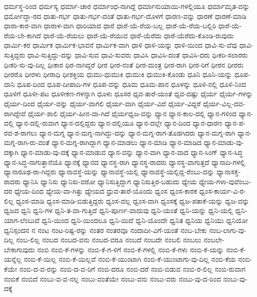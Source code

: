 {ಧರ್ಮಸ್ಥ-ರಿಂದ
ಧರ್ಮಸ್ಯ
ಧರ್ಮಾ-ಚಾರ
ಧರ್ಮಾಂಧ-ನಾಗಿದ್ದೆ
ಧರ್ಮಾನುಯಾಯಿ-ಗಳಲ್ಲಿಯೂ
ಧರ್ಮಾಮೃತ-ವನ್ನು
ಧರ್ಮೋದ್ಧಾ-ರದ
ಧಾತು-ಗರ್ಭ
ಧಾತು-ಗರ್ಭ-ದಂತೆ
ಧಾತು-ಗರ್ಭ-ದೊಳಗೆ
ಧಾರಣ-ವನ್ನು
ಧಾರಣೆ
ಧಾರಣೆ-ಮಾಡಿ
ಧಾರಾ-ಕಾರ-ವಾಗಿ
ಧಾರಾಳ-ವಾಗಿ
ಧಾರಿಯಾದ
ಧಾರೆ
ಧಾರೆ-ಯೆ-ರೆಯ-ಬಲ್ಲ
ಧಾರೆ-ಯೆ-ರೆಯ-ಬಲ್ಲಿರಿ
ಧಾರೆ-ಯೆ-ರೆಯ-ಬೇ-ಕಾಗಿದೆ
ಧಾರೆ-ಯೆ-ರೆಯಲು
ಧಾರೆ-ಯೆ-ರೆಯುವ
ಧಾರೆ-ಯೆರೆದು
ಧಾರೆ-ಯೆರೆದು-ಕೊಂಡಿ-ರುವುದು
ಧಾರ್ಮಿ-ಕರ
ಧಾರ್ಮಿಕ
ಧಾರ್ಮಿಕ-ಭಾವನೆ
ಧಾರ್ಮಿಕ-ವಾಗಿ
ಧಾಳಿ
ಧಾಳಿ-ಯನ್ನು
ಧಾಳಿ-ಯಿಂದ
ಧಾವಿ-ಸು-ವೆವು
ಧಾವಿ-ಸುತ್ತಿದ್ದರು
ಧಾವಿ-ಸುತ್ತಿದ್ದು-ದನ್ನು
ಧಾವಿ-ಸುವ
ಧಾವಿ-ಸುವರು
ಧಾವಿಸಿ
ಧಾವಿಸಿ-ದಂತೆ
ಧಾವಿಸಿ-ದರು
ಧಿಃಕರಿ-ಸಲಾರರು
ಧಿಃಕರಿ-ಸು-ವು-ದಿಲ್ಲ
ಧಿಃಕಾರ
ಧಿರ-ನಾಗಿದ್ದರೆ
ಧೀರ
ಧೀರ-ನಂತೆ
ಧೀರ-ಮಂತ್ರ
ಧೀರ-ರಾಗಿ
ಧೀರ-ರಿಗೆ
ಧೀರನ
ಧೀರರು
ಧೀರರೊ
ಧೀರಳು
ಧೀರಾಧಿ
ಧೀಶಕ್ತಿಯ
ಧುಮು-ಧುಮುಕಿ
ಧುಮುಕಿ
ಧುಮುಕಿ-ಕೊಂಡು
ಧೂನಿ
ಧೂನಿ-ಯನ್ನು
ಧೂಪ-ದಾನಿ
ಧೂಪ-ದಿಂದ
ಧೂಪ-ದೀಪಾದಿ-ಗಳ
ಧೂಪ-ವನ್ನು
ಧೂಮ
ಧೂಮ-ಪಾನ
ಧೂಳನ್ನು
ಧೂಳಿ-ನಲ್ಲಿ
ಧೂಳಿ-ನಿಂದ
ಧೂಳಿಗೆ
ಧೂಳೀ-ಪಟ
ಧೂಳೀಕಣ-ಗಳನ್ನಾಗಿ
ಧೂಳು
ಧೂಸರ
ಧೃವ-ತಾರೆ-ಯಂತೆ
ಧೃವ-ದಷ್ಟು
ಧೈರ್ಯ
ಧೈರ್ಯ-ಗಳನ್ನು
ಧೈರ್ಯ-ದಿಂದ
ಧೈರ್ಯ-ವನ್ನು
ಧೈರ್ಯ-ವಾಗಲಿ
ಧೈರ್ಯ-ವಾಗಿ
ಧೈರ್ಯ-ವಿದೆ
ಧೈರ್ಯ-ವಿದ್ದರೆ
ಧೈರ್ಯ-ವಿಲ್ಲ-ದವ-ರಾಗಿದ್ದೇವೆ
ಧೈರ್ಯ-ಶಾಲಿ
ಧೈರ್ಯ-ಹೀನ-ವಾ-ಗಿದೆ
ಧೈರ್ಯಧ್ವಜ-ವನ್ನು
ಧ್ಯಾನ
ಧ್ಯಾನ-ಕಾಲ-ದಲ್ಲಿ
ಧ್ಯಾನ-ಗಳಿಂದ
ಧ್ಯಾನ-ದಲ್ಲಿ
ಧ್ಯಾನ-ದಲ್ಲಿ-ರುವಾಗ
ಧ್ಯಾನ-ದಲ್ಲಿದ್ದರು
ಧ್ಯಾನ-ದಲ್ಲಿಯೂ
ಧ್ಯಾನ-ದಲ್ಲೇ
ಧ್ಯಾನ-ದಿಂದ
ಧ್ಯಾನ-ಧಾರಣ
ಧ್ಯಾನ-ಪ-ರವ-ಶ-ರಾಗಲು
ಧ್ಯಾನ-ಮಗ್ನ
ಧ್ಯಾನ-ಮಗ್ನ-ನಾಗಿದ್ದು-ದನ್ನು
ಧ್ಯಾನ-ಮಗ್ನ-ರಾಗ-ತೊಡಗಿದರು
ಧ್ಯಾನ-ಮಗ್ನ-ರಾಗಿ
ಧ್ಯಾನ-ಮಗ್ನ-ರಾಗಿ-ರು-ವಂತೆ
ಧ್ಯಾನ-ಮಗ್ನ-ರಾಗಿದ್ದಾಗ
ಧ್ಯಾನ-ಮಾಡಲು
ಧ್ಯಾನ-ಮಾಡಿ
ಧ್ಯಾನ-ಮಾಡಿದ
ಧ್ಯಾನ-ಮಾಡು-ವು-ದಕ್ಕಾಗಿ
ಧ್ಯಾನ-ಮಾಡು-ವು-ದಕ್ಕೆ
ಧ್ಯಾನ-ಮಾಡುವ
ಧ್ಯಾನ-ವನ್ನು
ಧ್ಯಾನ-ವಾಗಿ
ಧ್ಯಾನ-ವಾದ
ಧ್ಯಾನ-ಸಿಂಗ್
ಧ್ಯಾನ-ಸಿದ್ಧ
ಧ್ಯಾನ-ಸಿದ್ಧ-ನಾಗುತ್ತಾನೆಯೊ
ಧ್ಯಾನಕ್ಕೆ
ಧ್ಯಾನದ
ಧ್ಯಾನಸ್ಥ-ರಾಗಿ
ಧ್ಯಾನಸ್ಥ-ರಾದರು
ಧ್ಯಾನಸ್ಥ-ವಾಗುತ್ತದೆ
ಧ್ಯಾನಾದಿ-ಗಳಲ್ಲಿ
ಧ್ಯಾನಾರೂಢ-ರಾ-ಗಿದ್ದರು
ಧ್ಯಾನಾವಸ್ಥೆ-ಯನ್ನು
ಧ್ಯಾನಾವಸ್ಥೆ-ಯಲ್ಲಿ
ಧ್ಯಾನಾವಸ್ಥೆ-ಯಲ್ಲಿದ್ದ-ರೆಂಬು-ದನ್ನು
ಧ್ಯಾನಾಸಕ್ತ-ರಾದರು
ಧ್ಯಾನಿಸಿ
ಧ್ಯಾನಿಸು
ಧ್ಯಾನಿಸು-ವರೋ
ಧ್ಯಾನಿಸುತ್ತಿದ್ದಾಗ
ಧ್ಯಾನಿಸುತ್ತಿರ-ಬಹುದು
ಧ್ಯೇಯ
ಧ್ಯೇಯ-ಗಳಾ-ವುವೆಂಬು-ದರ
ಧ್ಯೇಯ-ದಿಂದ
ಧ್ಯೇಯ-ವಾ-ಗಿತ್ತು
ಧ್ಯೇಯದ
ಧ್ರುವ-ತಾರೆ-ಯೊಂದು
ಧ್ವಂಸ
ಧ್ವಂಸ-ಕಾರಕ
ಧ್ವಂಸ-ಕಾರ್ಯ-ವಿ-ರ-ಲಿಲ್ಲ
ಧ್ವಂಸ-ಮಾಡಿ
ಧ್ವಂಸ-ಮಾಡಿ-ಬಿಡುತ್ತಿದ್ದರು
ಧ್ವಂಸ-ವಲ್ಲ
ಧ್ವಂಸ-ವಾಗಿ
ಧ್ವಂಸಕ್ಕೆ
ಧ್ವಜ-ಪತಾಕೆ-ಯನ್ನು
ಧ್ವಜ-ವನ್ನು
ಧ್ವಜದ
ಧ್ವನಿ
ಧ್ವನಿ-ಗಳ
ಧ್ವನಿ-ತ-ವಾ-ಗುತ್ತಿದೆ
ಧ್ವನಿ-ಪೂರ್ಣ-ವಾದುವು
ಧ್ವನಿ-ಯಂತೆ
ಧ್ವನಿ-ಯನ್ನು
ಧ್ವನಿ-ಯಲ್ಲಿ
ಧ್ವನಿ-ಯಾಗ-ಲೆಂಬುದೆ
ಧ್ವನಿ-ಯಿಂದ
ಧ್ವನಿ-ಯಿಂದಲೂ
ಧ್ವನಿ-ಯಿದೆ
ಧ್ವನಿ-ಯೊಂದೇ
ಧ್ವನಿತ
ಧ್ವನಿಯ
ಧ್ವನಿಯು
ಧ್ವನಿಯೋ
ಧ್ವನಿಸ್ಪಂದನ
ನ
ನಂಟ
ನಂಟ-ರಿಷ್ಟ-ರನ್ನು
ನಂತರ
ನಂತರವೂ
ನಂದಾದೀ-ವಿಗೆ-ಯಂತೆ
ನಂಬ-ಬೇಕು
ನಂಬ-ಲಾಗು-ವು-ದಿಲ್ಲ
ನಂಬ-ಲಿಲ್ಲ
ನಂಬದ
ನಂಬದ-ವನು
ನಂಬದ-ವರೂ
ನಂಬದೆ
ನಂಬದೇ
ನಂಬಲಿ
ನಂಬಲು
ನಂಬಲೇ-ಬೇಕಾಗುವುದು
ನಂಬಿ
ನಂಬಿ-ಕೆ-ಗಳನ್ನು
ನಂಬಿ-ಕೆ-ಗ-ಳಿಗೆ
ನಂಬಿ-ಕೆ-ಗಳಲ್ಲಿ
ನಂಬಿ-ಕೆ-ಗಳು
ನಂಬಿ-ಕೆ-ಯನ್ನು
ನಂಬಿ-ಕೆ-ಯನ್ನೆಲ್ಲ
ನಂಬಿ-ಕೆ-ಯಿಲ್ಲ
ನಂಬಿ-ಕೆ-ಯಿಲ್ಲವೆ
ನಂಬಿ-ಕೆ-ಯುಂಟಾಗಿ
ನಂಬಿ-ಕೆ-ಯುಂಟಾಗು-ವು-ದಿಲ್ಲ
ನಂಬಿ-ಕೆಯ
ನಂಬಿ-ಕೆಯೇ
ನಂಬಿ-ದ-ವ-ರನ್ನು
ನಂಬಿ-ದ-ವ-ರಿಗೆ
ನಂಬಿ-ದರೂ
ನಂಬಿ-ದರೆ
ನಂಬಿ-ಬಿಡುವ
ನಂಬಿ-ರ-ಲಿಲ್ಲ
ನಂಬಿ-ರುವಾಗ
ನಂಬಿಕೆ
ನಂಬಿದೆ
ನಂಬು-ವ-ವ-ನಲ್ಲ
ನಂಬು-ವಂತೆಯೇ
ನಂಬು-ವನು
ನಂಬು-ವರು
ನಂಬು-ವು-ದ-ರಿಂದ
ನಂಬು-ವು-ದಕ್ಕೆ
}
